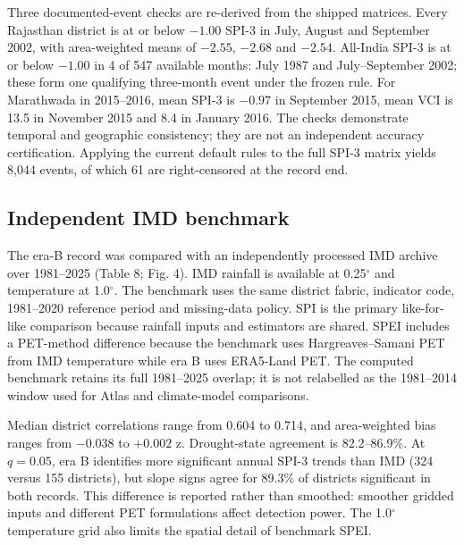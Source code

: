 \documentclass[11pt,a4paper]{article}
\begin{document}
Three documented-event checks are re-derived from the shipped matrices. Every Rajasthan district is at or below $-1.00$ SPI-3 in July, August and September 2002, with area-weighted means of $-2.55$, $-2.68$ and $-2.54$. All-India SPI-3 is at or below $-1.00$ in 4 of 547 available months: July 1987 and July--September 2002; these form one qualifying three-month event under the frozen rule. For Marathwada in 2015--2016, mean SPI-3 is $-0.97$ in September 2015, mean VCI is 13.5 in November 2015 and 8.4 in January 2016. The checks demonstrate temporal and geographic consistency; they are not an independent accuracy certification. Applying the current default rules to the full SPI-3 matrix yields 8,044 events, of which 61 are right-censored at the record end.

\subsection*{Independent IMD benchmark}
The era-B record was compared with an independently processed IMD archive over 1981--2025 (Table 8; Fig. 4). IMD rainfall is available at 0.25$^\circ$ and temperature at 1.0$^\circ$. The benchmark uses the same district fabric, indicator code, 1981--2020 reference period and missing-data policy. SPI is the primary like-for-like comparison because rainfall inputs and estimators are shared. SPEI includes a PET-method difference because the benchmark uses Hargreaves--Samani PET from IMD temperature while era B uses ERA5-Land PET. The computed benchmark retains its full 1981--2025 overlap; it is not relabelled as the 1981--2014 window used for Atlas and climate-model comparisons.

Median district correlations range from 0.604 to 0.714, and area-weighted bias ranges from $-0.038$ to $+0.002$ z. Drought-state agreement is 82.2--86.9\%. At $q=0.05$, era B identifies more significant annual SPI-3 trends than IMD (324 versus 155 districts), but slope signs agree for 89.3\% of districts significant in both records. This difference is reported rather than smoothed: smoother gridded inputs and different PET formulations affect detection power. The 1.0$^\circ$ temperature grid also limits the spatial detail of benchmark SPEI.
\end{document}
